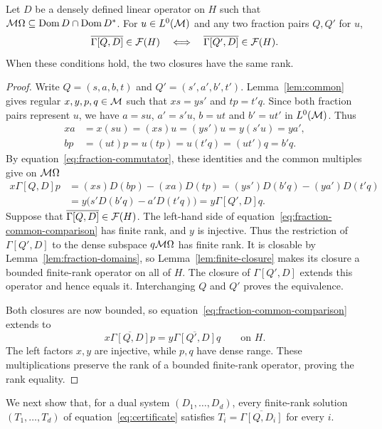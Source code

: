 \begin{lemma}\label{lem:fraction-ranks}
Let $D$ be a densely defined linear operator on $H$ such that
$\mathcal M\Omega\subseteq\operatorname{Dom} D\cap\operatorname{Dom} D^*$.
For $u\in L^0(\mathcal M)$ and any two fraction pairs $Q,Q'$ for $u$,
\[
 \overline{\Gamma[Q,D]}\in\mathcal F(H)
 \quad\Longleftrightarrow\quad
 \overline{\Gamma[Q',D]}\in\mathcal F(H).
\]
When these conditions hold, the two closures have the same rank.
\end{lemma}
\begin{proof}
Write $Q=(s,a,b,t)$ and $Q'=(s',a',b',t')$.
Lemma~\ref{lem:common} gives regular $x,y,p,q\in\mathcal M$ such that $xs=ys'$ and $tp=t'q$.
Since both fraction pairs represent $u$, we have $a=su$, $a'=s'u$, $b=ut$ and $b'=ut'$ in $L^0(\mathcal M)$.
Thus
\begin{align*}
 xa&=x(su)=(xs)u=(ys')u=y(s'u)=ya',\\
 bp&=(ut)p=u(tp)=u(t'q)=(ut')q=b'q.
\end{align*}
By equation~\eqref{eq:fraction-commutator}, these identities and the common multiples give on $\mathcal M\Omega$
\begin{equation}\label{eq:fraction-common-comparison}
 \begin{aligned}
 x\Gamma[Q,D]p
 &=(xs)D(bp)-(xa)D(tp)
  =(ys')D(b'q)-(ya')D(t'q)\\
 &=y\bigl(s'D(b'q)-a'D(t'q)\bigr)
  =y\Gamma[Q',D]q.
 \end{aligned}
\end{equation}
Suppose that $\overline{\Gamma[Q,D]}\in\mathcal F(H)$.
The left-hand side of equation~\eqref{eq:fraction-common-comparison} has finite rank, and $y$ is injective.
Thus the restriction of $\Gamma[Q',D]$ to the dense subspace $q\mathcal M\Omega$ has finite rank.
It is closable by Lemma~\ref{lem:fraction-domains}, so Lemma~\ref{lem:finite-closure} makes its closure a bounded finite-rank operator on all of $H$.
The closure of $\Gamma[Q',D]$ extends this operator and hence equals it.
Interchanging $Q$ and $Q'$ proves the equivalence.

Both closures are now bounded, so equation~\eqref{eq:fraction-common-comparison} extends to
\[
 x\overline{\Gamma[Q,D]}p=y\overline{\Gamma[Q',D]}q
 \qquad\text{on }H.
\]
The left factors $x,y$ are injective, while $p,q$ have dense range.
These multiplications preserve the rank of a bounded finite-rank operator, proving the rank equality.
\end{proof}

We next show that, for a dual system $(D_1,\ldots,D_d)$, every finite-rank solution $(T_1,\ldots,T_d)$ of equation~\eqref{eq:certificate} satisfies $T_i=\overline{\Gamma[Q,D_i]}$ for every $i$.

